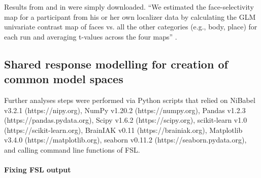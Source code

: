 


%
Results from \citet{sengupta2016extension} and in
\citet{haeusler2022processing} were simply downloaded.
%
``We estimated the face-selectivity map for a participant from his or her own
localizer data by calculating the GLM univariate contrast map of faces vs. all
the other categories (e.g., body, place) for each run and averaging t-values
across the four maps'' \citep{jiahui2020predicting}.


\subsection{Shared response modelling for creation of common model spaces}


Further analyses steps were performed via Python scripts that relied on
%
NiBabel v3.2.1 (https://nipy.org),
%
NumPy v1.20.2 (https://numpy.org),
%
Pandas v1.2.3 (https://pandas.pydata.org),
%
Scipy v1.6.2 (https://scipy.org),
%
scikit-learn v1.0 (https://scikit-learn.org),
%
BrainIAK v0.11 (https://brainiak.org),
%
Matplotlib v3.4.0 (https://matplotlib.org),
%
seaborn v0.11.2 (https://seaborn.pydata.org),
%
and calling command line functions of FSL.

\paragraph{Fixing FSL output}





